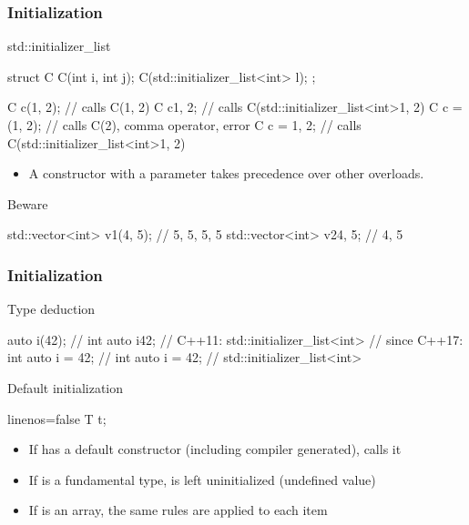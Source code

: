 \begin{frame}[fragile,shrink=10]
  \frametitle{Initialization}
  \begin{block}{std::initializer\_list}
    \begin{cppcode}
      struct C {
        C(int i, int j);
        C(std::initializer_list<int> l);
      };

      C c(1, 2);    // calls C(1, 2)
      C c{1, 2};    // calls C(std::initializer_list<int>{1, 2})
      C c = (1, 2); // calls C(2), comma operator, error
      C c = {1, 2}; // calls C(std::initializer_list<int>{1, 2})
    \end{cppcode}
    \begin{itemize}
      \item A constructor with a  parameter takes precedence over other overloads.
    \end{itemize}
  \end{block}
  \begin{alertblock}{Beware}
    \begin{cppcode}
      std::vector<int> v1(4, 5); // {5, 5, 5, 5}
      std::vector<int> v2{4, 5}; // {4, 5}
    \end{cppcode}
  \end{alertblock}
\end{frame}

\begin{frame}[fragile]
  \frametitle{Initialization}
  \begin{block}{Type deduction}
    \begin{cppcode}
      auto i(42);    // int
      auto i{42};    // C++11: std::initializer_list<int>
                     // since C++17: int
      auto i = 42;   // int
      auto i = {42}; // std::initializer_list<int>
    \end{cppcode}
  \end{block}
\end{frame}

\begin{frame}[fragile]
  \begin{block}{Default initialization}
    \begin{cppcode*}{linenos=false}
      T t;
    \end{cppcode*}
    \begin{itemize}
      \item If  has a default constructor (including compiler generated), calls it
      \item If  is a fundamental type,  is left uninitialized (undefined value)
      \item If  is an array, the same rules are applied to each item
    \end{itemize}
  \end{block}
\end{frame}

